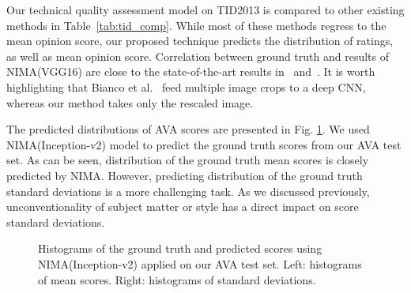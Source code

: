 \documentclass[10pt,twocolumn,twoside]{IEEEtran}
\begin{document}
Our technical quality assessment model on TID2013 is compared to other existing methods in Table~\ref{tab:tid_comp}. While most of these methods regress to the mean opinion score, our proposed technique predicts the distribution of ratings, as well as mean opinion score. Correlation between ground truth and results of NIMA(VGG16) are close to the state-of-the-art results in~\cite{xu2016blind} and~\cite{bianco2016use}. It is worth highlighting that Bianco et al.~\cite{bianco2016use} feed multiple image crops to a deep CNN, whereas our method takes only the rescaled image.

The predicted distributions of AVA  scores are presented in Fig. \ref{fig:ava_eval_histograms}. We used NIMA(Inception-v2) model to predict the ground truth scores from our AVA test set. As can be seen, distribution of the ground truth mean scores is closely predicted by NIMA. However, predicting distribution of the ground truth standard deviations is a more challenging task. As we discussed previously, unconventionality of subject matter or style has a direct impact on score standard deviations.

\begin{figure}[!t]
\vspace{0 mm}
\begin{center}
\end{center}
\vspace{-3 mm}
{\caption{Histograms of the ground truth and predicted scores using NIMA(Inception-v2) applied on our AVA test set. Left: histograms of mean scores. Right: histograms of standard deviations. \label{fig:ava_eval_histograms}}}
\vspace{-0 mm}
\end{figure}
\end{document}
